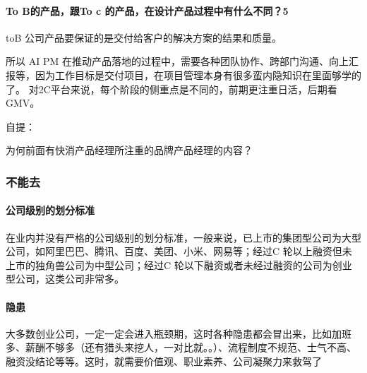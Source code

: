 \documentclass[letterpaper,11pt,english]{sphinxmanual}
\begin{document}
\paragraph{To B的产品，跟To c 的产品，在设计产品过程中有什么不同？5\sphinxfootnotemark[299]}
\label{\detokenize{chapter_interview/question:to-b-to-c-5}}%
\begin{footnotetext}[299]\sphinxAtStartFootnote
{}
%
\end{footnotetext}\ignorespaces 
toB
公司产品要保证的是交付给客户的解决方案的结果和质量。%
\begin{footnote}[300]\sphinxAtStartFootnote
{}
%
\end{footnote}所以
AI PM
在推动产品落地的过程中，需要各种团队协作、跨部门沟通、向上汇报等，因为工作目标是交付项目，在项目管理本身有很多蛮内隐知识在里面够学的了。
对2C平台来说，每个阶段的侧重点是不同的，前期更注重日活，后期看GMV。%
\begin{footnote}[301]\sphinxAtStartFootnote
{}
%
\end{footnote}

自提：

为何前面有快消产品经理所注重的品牌产品经理的内容？


\subsubsection{不能去}
\label{\detokenize{chapter_interview/not_go:id1}}\label{\detokenize{chapter_interview/not_go::doc}}

\paragraph{公司级别的划分标准}
\label{\detokenize{chapter_interview/not_go:id2}}
在业内并没有严格的公司级别的划分标准，一般来说，已上市的集团型公司为大型公司，如阿里巴巴、腾讯、百度、美团、小米、网易等；经过C
轮以上融资但未上市的独角兽公司为中型公司；经过C
轮以下融资或者未经过融资的公司为创业型公司，这类公司非常多。


\paragraph{隐患}
\label{\detokenize{chapter_interview/not_go:id3}}
大多数创业公司，一定一定会进入瓶颈期，这时各种隐患都会冒出来，比如加班多、薪酬不够多（还有猎头来挖人，一对比就。。）、流程制度不规范、士气不高、融资没结论等等。这时，就需要价值观、职业素养、公司凝聚力来救驾了
\end{document}
